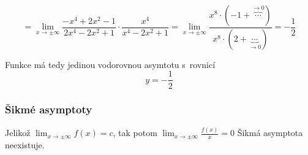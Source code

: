 \begin{displaymath}
= \lim_{x \to \pm \infty} \frac{-x^4+2x^2-1}{2x^4-2x^2+1} \cdot \frac{x^4}{x^4-2x^2+1} = \lim_{x \to \pm \infty} \frac {x^8\cdot(-1+ \overbrace{\cdots}^{\rightarrow0})}{x^8\cdot (2 +\underbrace{\cdots}_{\rightarrow0})} = -\frac{1}{2}
\end{displaymath}

Funkce má tedy jedinou vodorovnou asymtotu s~rovnicí
\begin{displaymath}
y = - \frac{1}{2}
\end{displaymath}

\subsubsection{Šikmé asymptoty}

Jelikož $\lim_{x \to \pm \infty} f(x) = c$, tak potom $\lim_{x \to \pm \infty} \frac{f(x)}{x} = 0$ Šikmá asymptota neexistuje. 
